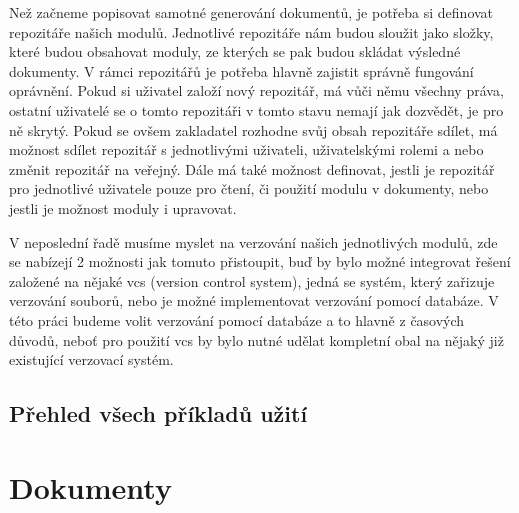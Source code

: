 Než začneme popisovat samotné generování dokumentů, je potřeba si definovat repozitáře našich modulů. Jednotlivé repozitáře nám budou sloužit jako složky,
které budou obsahovat moduly, ze kterých se pak budou skládat výsledné dokumenty. V rámci repozitářů je potřeba hlavně zajistit správně fungování oprávnění.
Pokud si uživatel založí nový repozitář, má vůči němu všechny práva, ostatní uživatelé se o tomto repozitáři v tomto stavu nemají jak dozvědět, je pro ně
skrytý. Pokud se ovšem zakladatel rozhodne svůj obsah repozitáře sdílet, má možnost sdílet repozitář s jednotlivými uživateli, uživatelskými rolemi a nebo
změnit repozitář na veřejný. Dále má také možnost definovat, jestli je repozitář pro jednotlivé uživatele pouze pro čtení, či použití modulu v dokumenty,
nebo jestli je možnost moduly i upravovat.

V neposlední řadě musíme myslet na verzování našich jednotlivých modulů, zde se nabízejí 2 možnosti jak tomuto přistoupit, buď by bylo možné integrovat
řešení založené na nějaké vcs (version control system), jedná se systém, který zařizuje verzování souborů,
nebo je možné implementovat verzování pomocí databáze. V této práci budeme volit verzování pomocí databáze a to hlavně z časových důvodů, neboť
pro použití vcs by bylo nutné udělat kompletní obal na nějaký již existující verzovací systém.

\subsection{Přehled všech příkladů užití}

\section{Dokumenty}

